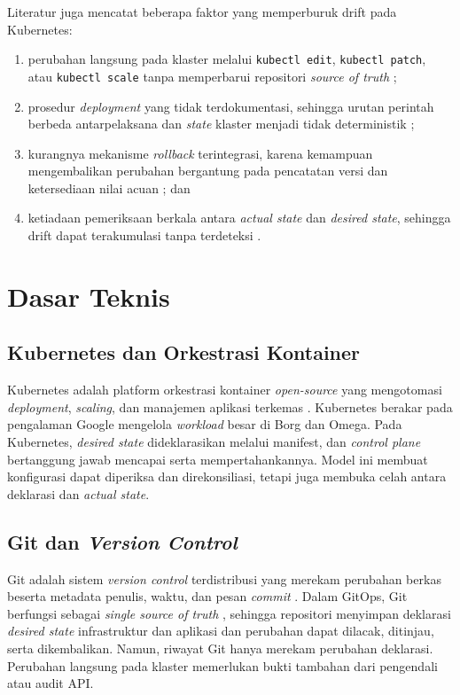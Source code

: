 Literatur juga mencatat beberapa faktor yang memperburuk drift pada Kubernetes:
\begin{enumerate}
  \item perubahan langsung pada klaster melalui \texttt{kubectl\allowbreak{} edit}, \texttt{kubectl\allowbreak{} patch}, atau \texttt{kubectl\allowbreak{} scale} tanpa memperbarui repositori \textit{source of truth} \citep{zhang2026configuration};
  \item prosedur \textit{deployment} yang tidak terdokumentasi, sehingga urutan perintah berbeda antarpelaksana dan \textit{state} klaster menjadi tidak deterministik \citep{pohjola2025mitigating};
  \item kurangnya mekanisme \textit{rollback} terintegrasi, karena kemampuan mengembalikan perubahan bergantung pada pencatatan versi dan ketersediaan nilai acuan \citep{rahman2023security}; dan
  \item ketiadaan pemeriksaan berkala antara \textit{actual state} dan \textit{desired state}, sehingga drift dapat terakumulasi tanpa terdeteksi \citep{zhang2026configuration}.
\end{enumerate}

\section{Dasar Teknis}

\subsection{Kubernetes dan Orkestrasi Kontainer}
Kubernetes adalah platform orkestrasi kontainer \textit{open-source} yang mengotomasi \textit{deployment}, \textit{scaling}, dan manajemen aplikasi terkemas \citep{burns2016borg, verma2015borg}. Kubernetes berakar pada pengalaman Google mengelola \textit{workload} besar di Borg dan Omega. Pada Kubernetes, \textit{desired state} dideklarasikan melalui manifest, dan \textit{control plane} bertanggung jawab mencapai serta mempertahankannya. Model ini membuat konfigurasi dapat diperiksa dan direkonsiliasi, tetapi juga membuka celah antara deklarasi dan \textit{actual state}.

\subsection{Git dan \textit{Version Control}}
Git adalah sistem \textit{version control} terdistribusi yang merekam perubahan berkas beserta metadata penulis, waktu, dan pesan \textit{commit} \citep{chacon2014git}. Dalam GitOps, Git berfungsi sebagai \textit{single source of truth} \citep{opengitops2021}, sehingga repositori menyimpan deklarasi \textit{desired state} infrastruktur dan aplikasi dan perubahan dapat dilacak, ditinjau, serta dikembalikan. Namun, riwayat Git hanya merekam perubahan deklarasi. Perubahan langsung pada klaster memerlukan bukti tambahan dari pengendali atau audit API.


